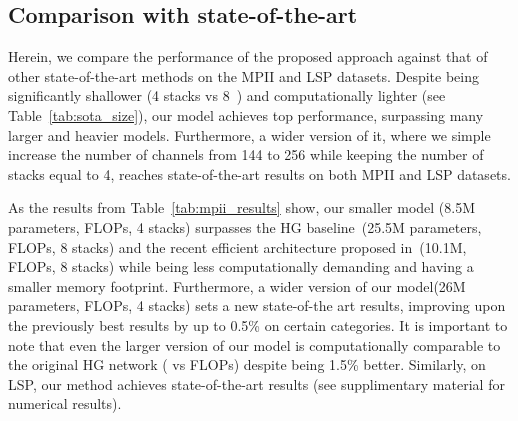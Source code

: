 \documentclass[a4paper, 10pt, conference]{ieeeconf}      \usepackage{FG2020}
\begin{document}
\begin{table*}[htb]
   \begin{center}
    \end{center}
    \caption{\textbf{Comparison in terms of number of parameters and PCKh accuracy with state-of-the-art on MPII testing set.}
}
    \label{tab:sota_size}
\end{table*}
\subsection{Comparison with state-of-the-art}

Herein, we compare the performance of the proposed approach against that of other state-of-the-art methods on the MPII and LSP datasets. Despite being significantly shallower (4 stacks vs 8~\cite{newell2016stacked,tang2018cu}) and computationally lighter (see Table~\ref{tab:sota_size}), our model achieves top performance, surpassing many larger and heavier models. Furthermore, a wider version of it, where we simple increase the number of channels from 144 to 256 while keeping the number of stacks equal to 4, reaches state-of-the-art results on both MPII and LSP datasets.

As the results from Table~\ref{tab:mpii_results} show, our smaller model (8.5M parameters,  FLOPs, 4 stacks) surpasses the HG baseline~\cite{newell2016stacked}(25.5M parameters,  FLOPs, 8 stacks) and the recent efficient architecture proposed in~\cite{tang2018cu}(10.1M,  FLOPs, 8 stacks) while being less computationally demanding and having a smaller memory footprint. Furthermore, a wider version of our model(26M parameters,  FLOPs, 4 stacks) sets a new state-of-the art results, improving upon the previously best results by up to 0.5\% on certain categories. It is important to note that even the larger version of our model is computationally comparable to the original HG network ( vs  FLOPs) despite being 1.5\% better. Similarly, on LSP, our method achieves state-of-the-art results (see supplimentary material for numerical results). 
\end{document}

